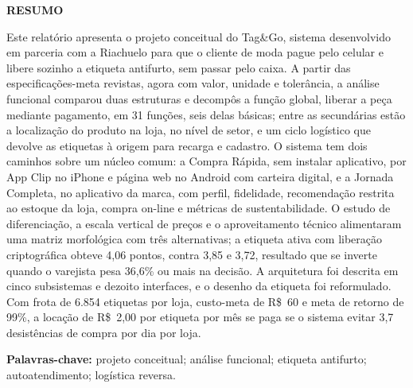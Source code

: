\begin{center}
    \textbf{RESUMO}
\end{center}

\noindent Este relatório apresenta o projeto conceitual do Tag\&Go, sistema desenvolvido em parceria com a Riachuelo para que o cliente de moda pague pelo celular e libere sozinho a etiqueta antifurto, sem passar pelo caixa. A partir das especificações-meta revistas, agora com valor, unidade e tolerância, a análise funcional comparou duas estruturas e decompôs a função global, liberar a peça mediante pagamento, em 31 funções, seis delas básicas; entre as secundárias estão a localização do produto na loja, no nível de setor, e um ciclo logístico que devolve as etiquetas à origem para recarga e cadastro. O sistema tem dois caminhos sobre um núcleo comum: a Compra Rápida, sem instalar aplicativo, por App Clip no iPhone e página web no Android com carteira digital, e a Jornada Completa, no aplicativo da marca, com perfil, fidelidade, recomendação restrita ao estoque da loja, compra on-line e métricas de sustentabilidade. O estudo de diferenciação, a escala vertical de preços e o aproveitamento técnico alimentaram uma matriz morfológica com três alternativas; a etiqueta ativa com liberação criptográfica obteve 4,06 pontos, contra 3,85 e 3,72, resultado que se inverte quando o varejista pesa 36,6\% ou mais na decisão. A arquitetura foi descrita em cinco subsistemas e dezoito interfaces, e o desenho da etiqueta foi reformulado. Com frota de 6.854 etiquetas por loja, custo-meta de R\$~60 e meta de retorno de 99\%, a locação de R\$~2,00 por etiqueta por mês se paga se o sistema evitar 3,7 desistências de compra por dia por loja.

\vspace{1em}
\noindent\textbf{Palavras-chave:} projeto conceitual; análise funcional; etiqueta antifurto; autoatendimento; logística reversa.
